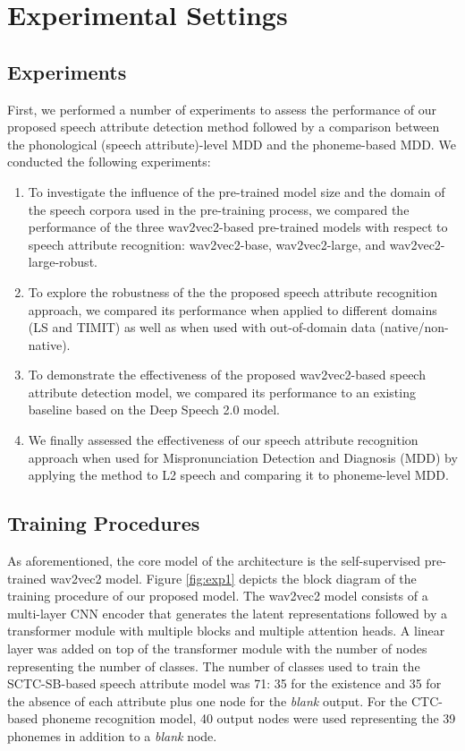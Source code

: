 \documentclass[12pt]{elsarticle}
\begin{document}
\section{Experimental Settings}
\label{sec:expset}

\subsection{Experiments}

First, we performed a number of experiments to assess the performance of our proposed speech attribute detection method followed by a comparison between the phonological (speech attribute)-level MDD and the phoneme-based MDD. We conducted the following experiments:
\begin{enumerate}
    \item To investigate the influence of the pre-trained model size and the domain of the speech corpora used in the pre-training process, we compared the performance of the three wav2vec2-based pre-trained models with respect to speech attribute recognition: wav2vec2-base, wav2vec2-large, and wav2vec2-large-robust.
    \item To explore the robustness of the the proposed speech attribute recognition approach, we compared its performance when applied to different domains (LS and TIMIT) as well as when used with out-of-domain data (native/non-native).
    \item To demonstrate the effectiveness of the proposed wav2vec2-based speech attribute detection model, we compared its performance to an existing baseline based on the Deep Speech 2.0 \cite{RN137} model.
    \item We finally assessed the effectiveness of our speech attribute recognition approach when used for Mispronunciation Detection and Diagnosis (MDD) by applying the method to L2 speech and comparing it to phoneme-level MDD.
\end{enumerate}
\subsection{Training Procedures}
\label{ssec:tran}

As aforementioned, the core model of the architecture is the self-supervised pre-trained wav2vec2 model. Figure \ref{fig:exp1} depicts the block diagram of the training procedure of our proposed model. The wav2vec2 model consists of a multi-layer CNN encoder that generates the latent representations followed by a transformer module with multiple blocks and multiple attention heads. A linear layer was added on top of the transformer module with the number of nodes representing the number of classes. The number of classes used to train the SCTC-SB-based speech attribute model was 71: 35 for the existence and 35 for the absence of each attribute plus one node for the \textit{blank} output. For the CTC-based phoneme recognition model, 40 output nodes were used representing the 39 phonemes in addition to a \textit{blank} node.
\end{document}
